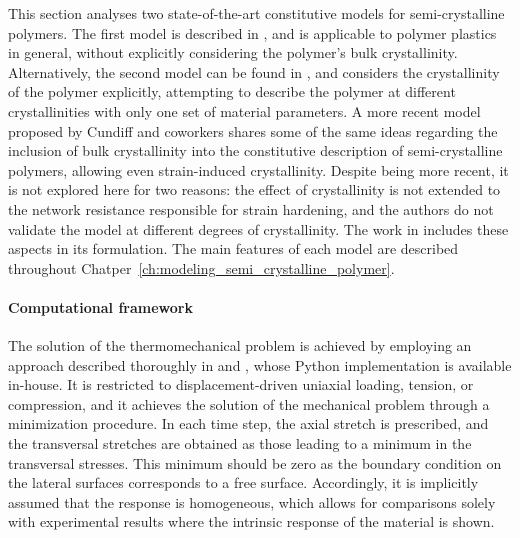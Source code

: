 This section analyses two state-of-the-art constitutive models for semi-crystalline polymers.
The first model is described in \cite{haoUnifiedAmorphousCrystalline2022}, and is applicable to polymer plastics in general, without explicitly considering the polymer's bulk crystallinity.
Alternatively, the second model can be found in \cite{abdul-hameedTwophaseHyperelasticviscoplasticConstitutive2014}, and considers the crystallinity of the polymer explicitly, attempting to describe the polymer at different crystallinities with only one set of material parameters.
A more recent model proposed by Cundiff and coworkers \citep{cundiffModelingViscoplasticBehavior2022} shares some of the same ideas regarding the inclusion of bulk crystallinity into the constitutive description of semi-crystalline polymers, allowing even strain-induced crystallinity.
Despite being more recent, it is not explored here for two reasons: the effect of crystallinity is not extended to the network resistance responsible for strain hardening, and the authors do not validate the model at different degrees of crystallinity.
The work in \cite{abdul-hameedTwophaseHyperelasticviscoplasticConstitutive2014} includes these aspects in its formulation.
The main features of each model are described throughout Chatper~\ref{ch:modeling_semi_crystalline_polymer}.

\paragraph{Computational framework}
The solution of the thermomechanical problem is achieved by employing an approach described thoroughly in \cite{bergstromMechanicsSolidPolymers2015} and \cite{alvesFastOptimizationbasedParameter2022}, whose Python implementation is available in-house.
It is restricted to displacement-driven uniaxial loading, tension, or compression, and it achieves the solution of the mechanical problem through a minimization procedure.
In each time step, the axial stretch is prescribed, and the transversal stretches are obtained as those leading to a minimum in the transversal stresses.
This minimum should be zero as the boundary condition on the lateral surfaces corresponds to a free surface.
Accordingly, it is implicitly assumed that the response is homogeneous, which allows for comparisons solely with experimental results where the intrinsic response of the material is shown.

